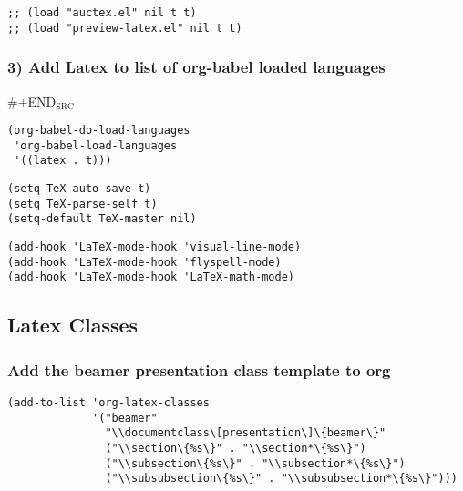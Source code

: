 \documentclass[11pt]{article}
\begin{document}
\begin{verbatim}
;; (load "auctex.el" nil t t)
;; (load "preview-latex.el" nil t t)
\end{verbatim}

\subsubsection*{3) Add Latex to list of org-babel loaded languages}
\label{sec:org1eb3355}

\#+END\(_{\text{SRC}}\)
\begin{verbatim}
(org-babel-do-load-languages
 'org-babel-load-languages
 '((latex . t)))
\end{verbatim}

\begin{verbatim}
(setq TeX-auto-save t)
(setq TeX-parse-self t)
(setq-default TeX-master nil)
\end{verbatim}


\begin{verbatim}
(add-hook 'LaTeX-mode-hook 'visual-line-mode)
(add-hook 'LaTeX-mode-hook 'flyspell-mode)
(add-hook 'LaTeX-mode-hook 'LaTeX-math-mode)   
\end{verbatim}




\subsection*{Latex Classes}
\label{sec:org201d2dc}
\subsubsection*{Add the beamer presentation class template to org}
\label{sec:org745931e}
\begin{verbatim}
(add-to-list 'org-latex-classes
             '("beamer"
               "\\documentclass\[presentation\]\{beamer\}"
               ("\\section\{%s\}" . "\\section*\{%s\}")
               ("\\subsection\{%s\}" . "\\subsection*\{%s\}")
               ("\\subsubsection\{%s\}" . "\\subsubsection*\{%s\}")))
\end{verbatim}
\end{document}
